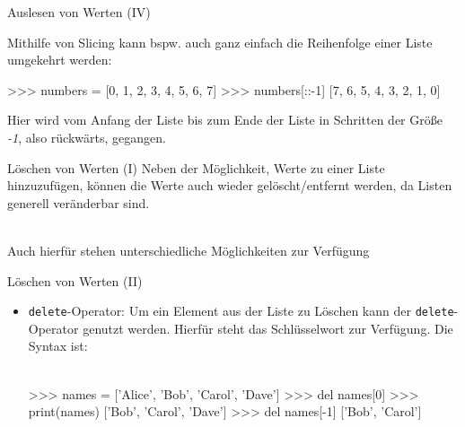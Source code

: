          \begin{frame}[fragile]{Auslesen von Werten (IV)}
        
            Mithilfe von Slicing kann bspw. auch ganz einfach die Reihenfolge einer Liste umgekehrt werden:
 
 \begin{pyconcode}
>>> numbers = [0, 1, 2, 3, 4, 5, 6, 7]
>>> numbers[::-1]
[7, 6, 5, 4, 3, 2, 1, 0]
\end{pyconcode}         

        Hier wird vom Anfang der Liste bis zum Ende der Liste in Schritten der Größe \textit{-1}, also rückwärts, gegangen.
            
        \end{frame}
        
        \begin{frame}[fragile]{Löschen von Werten (I)}
            Neben der Möglichkeit, Werte zu einer Liste hinzuzufügen, können die Werte auch wieder gelöscht/entfernt werden, da Listen generell veränderbar sind. \\~\
            
            Auch hierfür stehen unterschiedliche Möglichkeiten zur Verfügung
        \end{frame}
        
        \begin{frame}[fragile]{Löschen von Werten (II)}
            \begin{itemize}
                \item \texttt{delete}-Operator: Um ein Element aus der Liste zu Löschen kann der \texttt{delete}-Operator genutzt werden. Hierfür steht das Schlüsselwort  zur Verfügung.  Die Syntax ist: \\~\
                
                
\begin{pyconcode}
>>> names = ['Alice', 'Bob', 'Carol', 'Dave']
>>> del names[0]
>>> print(names)
['Bob', 'Carol', 'Dave']
>>> del names[-1]
['Bob', 'Carol']
\end{pyconcode} 

            \end{itemize}
        \end{frame}
        
